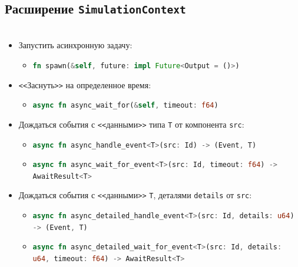 \documentclass[t]{beamer}  %
\begin{document}
 \subsection{Расширение \texttt{SimulationContext}}

 \begin{frame}[fragile]
	\frametitle{\insertsection} 
	\framesubtitle{\insertsubsection}

	\begin{columns}
\begin{column}[t]{1.1\linewidth}
	\vspace{-0.5cm}
	\begin{itemize}
		\setlength{\itemsep}{0.7em} 
		\item Запустить асинхронную задачу: 
		\begin{itemize}
			\item[\footnotesize\ding{58}]  \lstinline[language=Rust, basicstyle=\footnotesize\ttfamily]{fn spawn(&self, future: impl Future<Output = ()>)}
		\end{itemize}
		\item \texttt{<\textless}Заснуть\texttt{>\textgreater} на определенное время:
			\begin{itemize}
				\setlength{\itemsep}{0.5em} 
				\item[\footnotesize\ding{58}]  \lstinline[language=Rust, basicstyle=\footnotesize\ttfamily]{async fn async_wait_for(&self, timeout: f64)}
			\end{itemize}
		\item Дождаться события с \texttt{<\textless}данными\texttt{>\textgreater} типа \texttt{T} от компонента \texttt{src}:
			\begin{itemize}
				\setlength{\itemsep}{0.5em} 
				\item[\footnotesize\ding{58}] \lstinline[language=Rust,basicstyle=\footnotesize\ttfamily]{async fn async_handle_event<T>(src: Id) -> (Event, T)}
				\item[\footnotesize\ding{58}] \lstinline[language=Rust,basicstyle=\footnotesize\ttfamily]{async fn async_wait_for_event<T>(src: Id, timeout: f64) -> AwaitResult<T>}
			\end{itemize}
		\item Дождаться события с \texttt{<\textless}данными\texttt{>\textgreater} \texttt{T}, деталями \texttt{details} от \texttt{src}:
		\begin{itemize}
			\setlength{\itemsep}{0.5em} 
			\item[\footnotesize\ding{58}]\lstinline[language=Rust,basicstyle=\footnotesize\ttfamily]{async fn async_detailed_handle_event<T>(src: Id, details: u64) -> (Event, T)}
			\item[\footnotesize\ding{58}]  \lstinline[language=Rust,basicstyle=\footnotesize\ttfamily]{async fn async_detailed_wait_for_event<T>(src: Id, details: u64, timeout: f64) -> AwaitResult<T>}
		\end{itemize}
	\end{itemize}
\end{column}
\end{columns}
 \end{frame}
\end{document}
